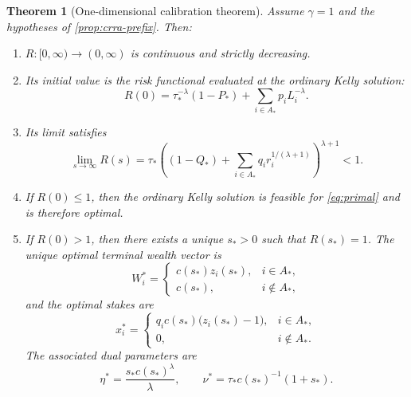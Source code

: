 \documentclass[11pt]{article}
\newtheorem{theorem}{Theorem}[section]
\theoremstyle{definition}
\theoremstyle{remark}
\newcommand{\1}{\mathbf{1}}
\begin{document}
\begin{theorem}[One-dimensional calibration theorem]
\label{thm:solver}
Assume $\gamma=1$ and the hypotheses of \cref{prop:crra-prefix}. Then:
\begin{enumerate}[label=\textnormal{(\alph*)},leftmargin=*]
\item $R:[0,\infty)\to(0,\infty)$ is continuous and strictly decreasing.
\item Its initial value is the risk functional evaluated at the ordinary Kelly solution:
\[
R(0)=\tau_*^{-\lambda}(1-P_*)+\sum_{i\in A_*} p_iL_i^{-\lambda}.
\]
\item Its limit satisfies
\[
\lim_{s\to\infty}R(s)
=\tau_*\left((1-Q_*)+\sum_{i\in A_*} q_i r_i^{1/(\lambda+1)}\right)^{\lambda+1}
< 1.
\]
\item If $R(0)\le 1$, then the ordinary Kelly solution is feasible for \eqref{eq:primal} and is therefore optimal.
\item If $R(0)>1$, then there exists a unique $s_*>0$ such that $R(s_*)=1$. The unique optimal terminal wealth vector is
\[
W_i^*=
\begin{cases}
c(s_*)z_i(s_*), & i\in A_*,\\
c(s_*), & i\notin A_*,
\end{cases}
\]
and the optimal stakes are
\[
x_i^*=
\begin{cases}
q_i c(s_*)\bigl(z_i(s_*)-1\bigr), & i\in A_*,\\
0, & i\notin A_*.
\end{cases}
\]
The associated dual parameters are
\[
\eta^*=\frac{s_*c(s_*)^\lambda}{\lambda},
\qquad
\nu^*=\tau_* c(s_*)^{-1}(1+s_*).
\]
\end{enumerate}
\end{theorem}
\end{document}
